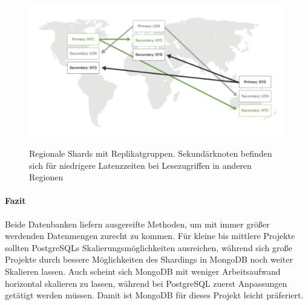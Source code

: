 \begin{figure}[ht]
	\centering
    \includegraphics[width=\textwidth]{sources/MongoDB_sharded.png}\cite{MG10}
	\caption{Regionale Shards mit Replikatgruppen. Sekundärknoten befinden sich für niedrigere Latenzzeiten bei Lesezugriffen in anderen Regionen}
	\label{fig1}
\end{figure}

\paragraph{Fazit\\}
Beide Datenbanken liefern ausgereifte Methoden, um mit immer größer werdenden Datenmengen zurecht zu kommen. Für kleine bis mittlere Projekte sollten PostgreSQLs Skalierungsmöglichkeiten ausreichen, während sich große Projekte durch bessere Möglichkeiten des Shardings in MongoDB noch weiter Skalieren lassen. Auch scheint sich MongoDB mit weniger Arbeitsaufwand horizontal skalieren zu lassen, während bei PostgreSQL zuerst Anpassungen getätigt werden müssen. Damit ist MongoDB für dieses Projekt leicht präferiert.

